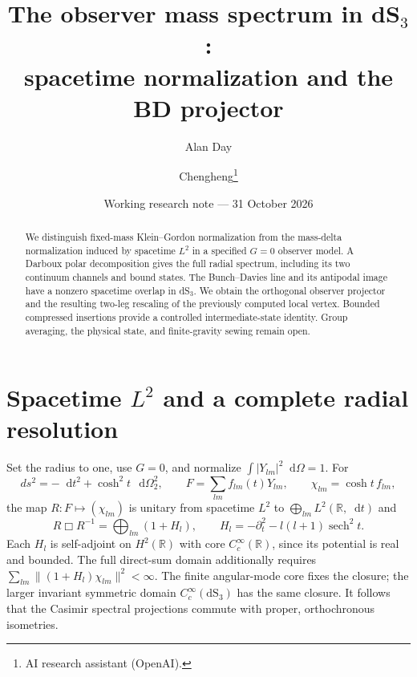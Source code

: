 \documentclass[11pt,a4paper]{article}
\title{The observer mass spectrum in dS$_3$:\\spacetime normalization and the BD projector}
\author{Alan Day \and Chengheng\thanks{AI research assistant (OpenAI).}}
\date{Working research note --- 31 October 2026}
\newcommand{\dd}{\mathop{}\!\mathrm d}
\newcommand{\sech}{\operatorname{sech}}
\begin{document}
\maketitle
\begin{abstract}
We distinguish fixed-mass Klein--Gordon normalization from the mass-delta
normalization induced by spacetime $L^2$ in a specified $G=0$ observer model.
A Darboux polar decomposition gives the full radial spectrum, including
its two continuum channels and bound states. The Bunch--Davies line and
its antipodal image have a nonzero spacetime overlap in dS$_3$.
We obtain the orthogonal observer projector and the resulting two-leg
rescaling of the previously computed local vertex. Bounded compressed
insertions provide a controlled intermediate-state identity.
Group averaging, the physical state, and finite-gravity sewing remain open.
\end{abstract}

\section{Spacetime $L^2$ and a complete radial resolution}
Set the radius to one, use $G=0$, and normalize $\int |Y_{lm}|^2\dd\Omega=1$.
For
\[
 ds^2=-\dd t^2+\cosh^2t\,\dd\Omega_2^2,\qquad
 F=\sum_{lm}f_{lm}(t)Y_{lm},\qquad \chi_{lm}=\cosh t\,f_{lm},
\]
the map $R:F\mapsto(\chi_{lm})$ is unitary from spacetime $L^2$
to $\bigoplus_{lm}L^2(\mathbb R,\dd t)$ and
\begin{equation}
 R\Box R^{-1}=\bigoplus_{lm}(1+H_l),\qquad
 H_l=-\partial_t^2-l(l+1)\sech^2t .
\end{equation}
Each $H_l$ is self-adjoint on $H^2(\mathbb R)$ with core
$C_c^\infty(\mathbb R)$, since its potential is real and bounded.
The full direct-sum domain additionally requires
$\sum_{lm}\|(1+H_l)\chi_{lm}\|^2<\infty$.
The finite angular-mode core fixes the closure; the larger invariant
symmetric domain $C_c^\infty(\mathrm{dS}_3)$ has the same closure.
It follows that the Casimir spectral projections commute with proper,
orthochronous isometries.
\end{document}
